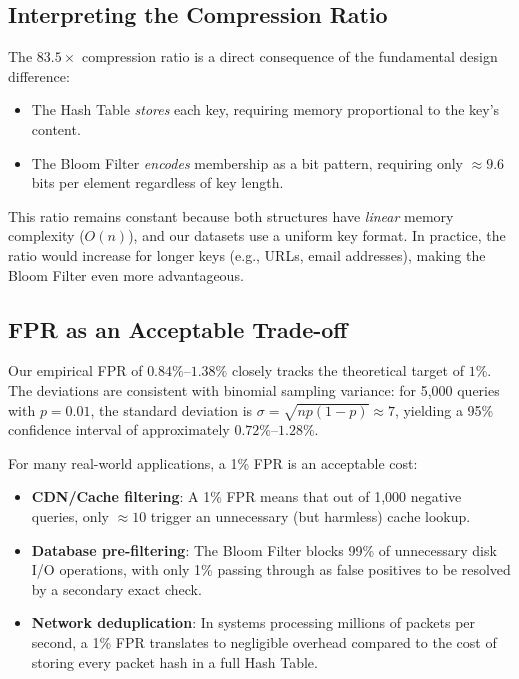 \subsection{Interpreting the Compression Ratio}
\label{subsec:compression}

The $83.5\times$ compression ratio is a direct consequence of the fundamental design difference:
\begin{itemize}[nosep]
    \item The Hash Table \emph{stores} each key, requiring memory proportional to the key's content.
    \item The Bloom Filter \emph{encodes} membership as a bit pattern, requiring only ${\approx}9.6$ bits per element regardless of key length.
\end{itemize}

This ratio remains constant because both structures have \emph{linear} memory complexity ($O(n)$), and our datasets use a uniform key format. In practice, the ratio would increase for longer keys (e.g., URLs, email addresses), making the Bloom Filter even more advantageous.

\subsection{FPR as an Acceptable Trade-off}
\label{subsec:fpr_tradeoff}

Our empirical FPR of $0.84\%$--$1.38\%$ closely tracks the theoretical target of $1\%$. The deviations are consistent with binomial sampling variance: for 5{,}000 queries with $p = 0.01$, the standard deviation is $\sigma = \sqrt{np(1-p)} \approx 7$, yielding a 95\% confidence interval of approximately $0.72\%$--$1.28\%$.

For many real-world applications, a 1\% FPR is an acceptable cost:
\begin{itemize}[nosep]
    \item \textbf{CDN/Cache filtering}: A 1\% FPR means that out of 1{,}000 negative queries, only ${\approx}10$ trigger an unnecessary (but harmless) cache lookup.
    \item \textbf{Database pre-filtering}: The Bloom Filter blocks 99\% of unnecessary disk I/O operations, with only 1\% passing through as false positives to be resolved by a secondary exact check.
    \item \textbf{Network deduplication}: In systems processing millions of packets per second, a 1\% FPR translates to negligible overhead compared to the cost of storing every packet hash in a full Hash Table.
\end{itemize}

